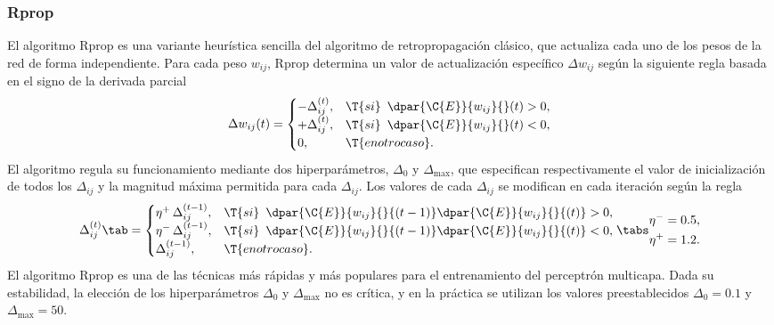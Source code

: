 %
\subsubsection{Rprop}
%
El algoritmo Rprop \cite{rprop} es una variante heurística sencilla
del algoritmo de retropropagación clásico, que actualiza cada uno de
los pesos de la red de forma independiente.
Para cada peso $w_{ij}$, Rprop determina un valor de actualización
específico $\Delta{}w_{ij}$ según la siguiente regla basada en el
signo de la derivada parcial
%
\begin{align}
  \Delta{}w_{ij}(t) =
  \begin{cases}
    -\Delta_{ij}^{(t)}, & \T{si}\,\,\,\dpar{\C{E}}{w_{ij}}{}(t) > 0, \\
    +\Delta_{ij}^{(t)}, & \T{si}\,\,\,\dpar{\C{E}}{w_{ij}}{}(t) < 0, \\
    0, & \T{en otro caso}.
  \end{cases}
\end{align}
%
El algoritmo regula su funcionamiento mediante dos hiperparámetros,
$\Delta_0$ y $\Delta_{\max}$, que especifican respectivamente el valor
de inicialización de todos los $\Delta_{ij}$ y la magnitud máxima
permitida para cada $\Delta_{ij}$.
Los valores de cada $\Delta_{ij}$ se modifican en cada iteración según
la regla
%
\begin{align}
  \Delta{}_{ij}^{(t)} \tab =
  \begin{cases}
    \eta^+\,\Delta_{ij}^{(t-1)}, & \T{si}\,\,\,\dpar{\C{E}}{w_{ij}}{} {(t-1)}
      \dpar{\C{E}}{w_{ij}}{} {(t)} > 0, \\
    \eta^-\,\Delta_{ij}^{(t-1)}, & \T{si}\,\,\,\dpar{\C{E}}{w_{ij}}{} {(t-1)}
      \dpar{\C{E}}{w_{ij}}{} {(t)} < 0, \\
    \Delta_{ij}^{(t-1)}, & \T{en otro caso}.
  \end{cases}
  \tabs
  \begin{split}
    \eta^-=0.5, \\
    \eta^+=1.2.
  \end{split}
\end{align}
%
El algoritmo Rprop es una de las técnicas más rápidas y más populares
para el entrenamiento del perceptrón multicapa.
Dada su estabilidad, la elección de los hiperparámetros $\Delta_{0}$ y
$\Delta_{\max}$ no es crítica, y en la práctica se utilizan los
valores preestablecidos $\Delta_{0}=0.1$ y $\Delta_{\max}=50$.
